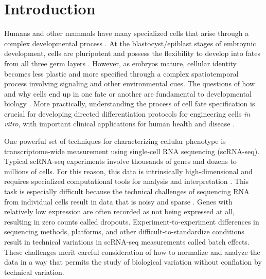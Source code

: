 \documentclass[aps,superscriptaddress, notitlepage,longbibliography]{revtex4-1}
\begin{document}
\section{Introduction}
Humans and other mammals have many specialized cells that arise through a complex developmental process  \cite{zeng_what_2022}. At the blastocyst/epiblast stages of embroynic development, cells are pluripotent and possess the flexibility to develop into fates from all three germ layers \cite{Wolpert_2019}. However, as embryos mature, cellular identity becomes less plastic and more specified through a complex spatiotemporal process involving signaling and other environmental cues. The questions of how and why cells end up in one fate or another are fundamental to developmental biology \cite{stephenson_intercellular_2012, zhu2020principles, rand2021geometry}. More practically, understanding the process of cell fate specification is crucial for developing directed differentiation protocols for engineering cells \emph{in vitro}, with important clinical applications for human health and disease \cite{rossant_impact_2011, rowe2019induced, basil2020cellular}.

One powerful set of techniques for characterizing cellular phenotype is transcriptome-wide measurement using single-cell RNA sequencing (scRNA-seq). Typical scRNA-seq experiments involve thousands of genes and dozens to millions of cells. For this reason, this data is intrinsically high-dimensional and requires specialized computational tools for analysis and interpretation \cite{zhu2020principles, setty2019characterization, schiebinger2019optimal}. This task is especially difficult because the technical challenges of sequencing RNA from individual cells result in data that is noisy and sparse \cite{hicks2018missing, lahnemann_eleven_2020, argelaguet2021computational}. Genes with relatively low expression are often recorded as not being expressed at all, resulting in zero counts called dropouts. Experiment-to-experiment differences in sequencing methods, platforms, and other difficult-to-standardize conditions result in technical variations in scRNA-seq measurements called batch effects. These challenges merit careful consideration of how to normalize and analyze the data in a way that permits the study of biological variation without conflation by technical variation.
\end{document}
